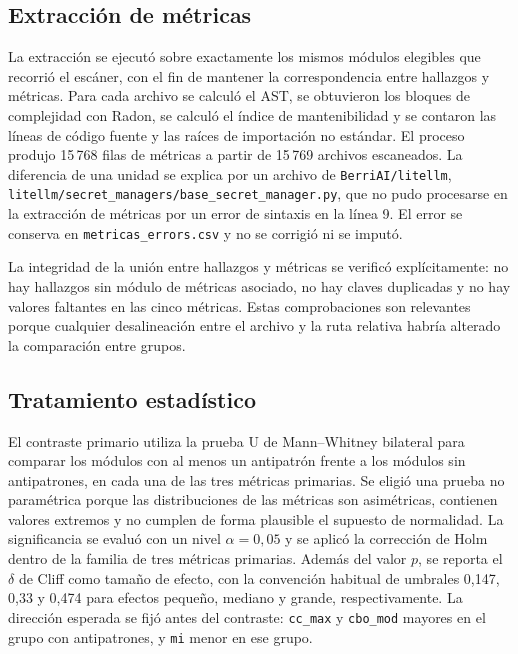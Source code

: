 \subsection{Extracción de métricas}

La extracción se ejecutó sobre exactamente los mismos módulos elegibles que recorrió el escáner, con el fin de mantener la correspondencia entre hallazgos y métricas. Para cada archivo se calculó el AST, se obtuvieron los bloques de complejidad con Radon, se calculó el índice de mantenibilidad y se contaron las líneas de código fuente y las raíces de importación no estándar. El proceso produjo 15\,768 filas de métricas a partir de 15\,769 archivos escaneados. La diferencia de una unidad se explica por un archivo de \texttt{BerriAI/litellm}, \texttt{litellm/secret\_managers/base\_secret\_manager.py}, que no pudo procesarse en la extracción de métricas por un error de sintaxis en la línea 9. El error se conserva en \texttt{metricas\_errors.csv} y no se corrigió ni se imputó.

La integridad de la unión entre hallazgos y métricas se verificó explícitamente: no hay hallazgos sin módulo de métricas asociado, no hay claves duplicadas y no hay valores faltantes en las cinco métricas. Estas comprobaciones son relevantes porque cualquier desalineación entre el archivo y la ruta relativa habría alterado la comparación entre grupos.

\subsection{Tratamiento estadístico}

El contraste primario utiliza la prueba U de Mann--Whitney bilateral para comparar los módulos con al menos un antipatrón frente a los módulos sin antipatrones, en cada una de las tres métricas primarias. Se eligió una prueba no paramétrica porque las distribuciones de las métricas son asimétricas, contienen valores extremos y no cumplen de forma plausible el supuesto de normalidad. La significancia se evaluó con un nivel $\alpha=0{,}05$ y se aplicó la corrección de Holm dentro de la familia de tres métricas primarias. Además del valor $p$, se reporta el $\delta$ de Cliff como tamaño de efecto, con la convención habitual de umbrales 0,147, 0,33 y 0,474 para efectos pequeño, mediano y grande, respectivamente. La dirección esperada se fijó antes del contraste: \texttt{cc\_max} y \texttt{cbo\_mod} mayores en el grupo con antipatrones, y \texttt{mi} menor en ese grupo.

